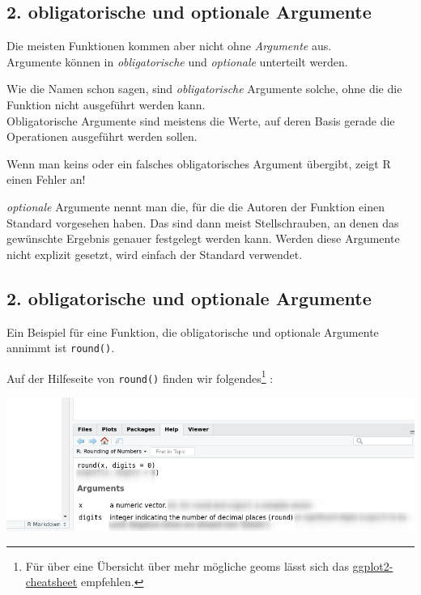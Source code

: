 \documentclass[
]{book}
\begin{document}
\hypertarget{obligatorische-und-optionale-argumente}{%
\subsection{2. obligatorische und optionale Argumente}\label{obligatorische-und-optionale-argumente}}

Die meisten Funktionen kommen aber nicht ohne \emph{Argumente} aus.\\
Argumente können in \emph{obligatorische} und \emph{optionale} unterteilt werden.

Wie die Namen schon sagen, sind \emph{obligatorische} Argumente solche, ohne die die Funktion nicht ausgeführt werden kann.\\
Obligatorische Argumente sind meistens die Werte, auf deren Basis gerade die Operationen ausgeführt werden sollen.

Wenn man keins oder ein falsches obligatorisches Argument übergibt, zeigt R einen Fehler an!

\emph{optionale} Argumente nennt man die, für die die Autoren der Funktion einen Standard vorgesehen haben. Das sind dann meist Stellschrauben, an denen das gewünschte Ergebnis genauer festgelegt werden kann. Werden diese Argumente nicht explizit gesetzt, wird einfach der Standard verwendet.

\hypertarget{obligatorische-und-optionale-argumente-1}{%
\subsection{2. obligatorische und optionale Argumente}\label{obligatorische-und-optionale-argumente-1}}

Ein Beispiel für eine Funktion, die obligatorische und optionale Argumente annimmt ist \texttt{round()}.

Auf der Hilfeseite von \texttt{round()} finden wir folgendes\footnote{Für über eine Übersicht über mehr mögliche geoms lässt sich das \href{https://raw.githubusercontent.com/rstudio/cheatsheets/master/data-visualization-2.1.pdf}{ggplot2-cheatsheet} empfehlen.} :

\begin{center}\includegraphics[width=0.8\linewidth]{imgs/help} \end{center}
\end{document}
